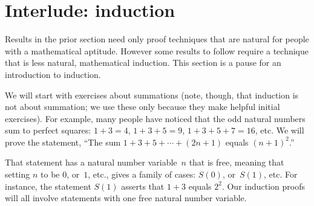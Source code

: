 \documentclass{test}  %
\begin{document}
\begin{problem}
\end{problem}




\section{Interlude: induction}
Results in the prior section need only proof techniques that are natural
for people with a mathematical aptitude.
However some results to follow require a technique 
that is less natural, mathematical induction.
This section is a pause for an introduction to induction.

We will start with exercises about summations 
(note, though, that induction is not about summation;
we use these only because they make helpful initial exercises).
For example, many people have noticed that the odd natural numbers sum to 
perfect squares: $1+3=4$, $1+3+5=9$, $1+3+5+7=16$, etc.
We will prove the statement,
``The sum $1+3+5+\cdots+(2n+1)$ equals $(n+1)^2$.'' 

That statement has a natural number variable~$n$ that is free, 
meaning that setting $n$ to be $0$, or~$1$, etc., gives 
a family of cases: $S(0)$, or~$S(1)$, 
etc.  
For instance, the statement $S(1)$ asserts that $1+3$ equals $2^2$.
Our induction proofs will all involve statements with one free 
natural number variable.
\end{document}
